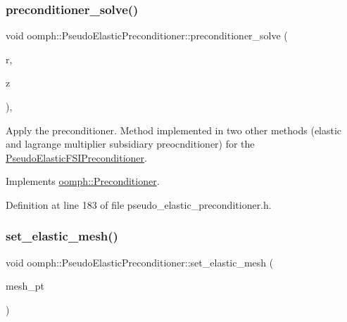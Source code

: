 \subsubsection{\texorpdfstring{preconditioner\+\_\+solve()}{preconditioner\_solve()}}
{\footnotesize\ttfamily void oomph\+::\+Pseudo\+Elastic\+Preconditioner\+::preconditioner\+\_\+solve (\begin{DoxyParamCaption}\item[{const \hyperlink{classoomph_1_1DoubleVector}{Double\+Vector} \&}]{r,  }\item[{\hyperlink{classoomph_1_1DoubleVector}{Double\+Vector} \&}]{z }\end{DoxyParamCaption})\hspace{0.3cm}{\ttfamily [inline]}, {\ttfamily [virtual]}}



Apply the preconditioner. Method implemented in two other methods (elastic and lagrange multiplier subsidiary preocnditioner) for the \hyperlink{classoomph_1_1PseudoElasticFSIPreconditioner}{Pseudo\+Elastic\+F\+S\+I\+Preconditioner}. 



Implements \hyperlink{classoomph_1_1Preconditioner_ace1199369e4465cd2b9a34884bb64ec8}{oomph\+::\+Preconditioner}.



Definition at line 183 of file pseudo\+\_\+elastic\+\_\+preconditioner.\+h.

\mbox{\label{classoomph_1_1PseudoElasticPreconditioner_ae115b58574a36c2c8fecb2524afa54f1}} 
\subsubsection{\texorpdfstring{set\+\_\+elastic\+\_\+mesh()}{set\_elastic\_mesh()}}
{\footnotesize\ttfamily void oomph\+::\+Pseudo\+Elastic\+Preconditioner\+::set\+\_\+elastic\+\_\+mesh (\begin{DoxyParamCaption}\item[{\hyperlink{classoomph_1_1Mesh}{Mesh} $\ast$}]{mesh\+\_\+pt }\end{DoxyParamCaption})\hspace{0.3cm}{\ttfamily [inline]}}



